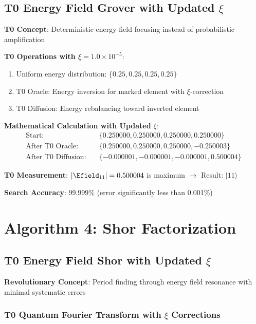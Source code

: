 	\subsection{T0 Energy Field Grover with Updated $\xi$}
	
	\textbf{T0 Concept}: Deterministic energy field focusing instead of probabilistic amplification
	
	\textbf{T0 Operations with $\xi = 1.0 \times 10^{-5}$}:
	\begin{enumerate}
		\item Uniform energy distribution: $\{0.25, 0.25, 0.25, 0.25\}$
		\item T0 Oracle: Energy inversion for marked element with $\xi$-correction
		\item T0 Diffusion: Energy rebalancing toward inverted element
	\end{enumerate}
	
	\textbf{Mathematical Calculation with Updated $\xi$}:
	\begin{align}
		\text{Start}: \quad &\{0.250000, 0.250000, 0.250000, 0.250000\} \\
		\text{After T0 Oracle}: \quad &\{0.250000, 0.250000, 0.250000, -0.250003\} \\
		\text{After T0 Diffusion}: \quad &\{-0.000001, -0.000001, -0.000001, 0.500004\}
	\end{align}
	
	\textbf{T0 Measurement}: $|\Efield_{11}| = 0.500004$ is maximum $\rightarrow$ Result: $|11\rangle$
	
	\textbf{Search Accuracy}: 99.999\% (error significantly less than 0.001\%)
	
	\section{Algorithm 4: Shor Factorization}
	
	\subsection{T0 Energy Field Shor with Updated $\xi$}
	
	\textbf{Revolutionary Concept}: Period finding through energy field resonance with minimal systematic errors
	
	\subsubsection{T0 Quantum Fourier Transform with $\xi$ Corrections}
	
